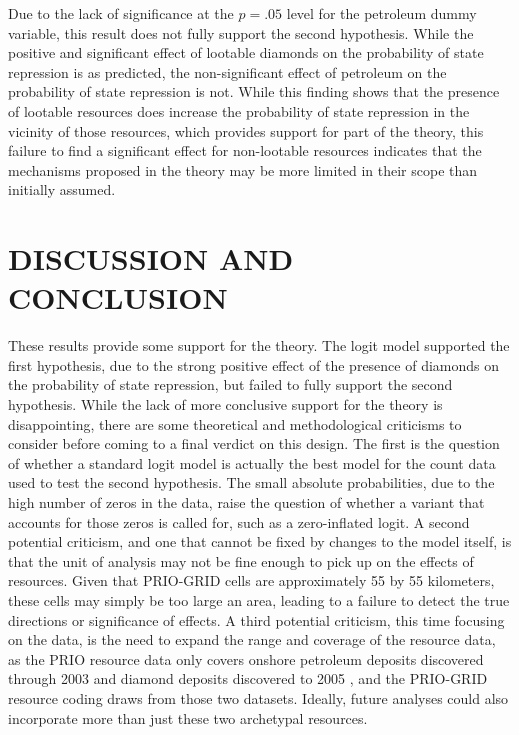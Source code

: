 Due to the lack of significance at the $p=.05$ level for the petroleum dummy variable, this result does not fully support the second hypothesis. While the positive and significant effect of lootable diamonds on the probability of state repression is as predicted, the non-significant effect of petroleum on the probability of state repression is not. While this finding shows that the presence of lootable resources does increase the probability of state repression in the vicinity of those resources, which provides support for part of the theory, this failure to find a significant effect for non-lootable resources indicates that the mechanisms proposed in the theory may be more limited in their scope than initially assumed. 

\newpage
\vspace*{25pt}
\section*{\normalfont \hfill DISCUSSION AND CONCLUSION \hfill}
These results provide some support for the theory. The logit model supported the first hypothesis, due to the strong positive effect of the presence of diamonds on the probability of state repression, but failed to fully support the second hypothesis. While the lack of more conclusive support for the theory is disappointing, there are some theoretical and methodological criticisms to consider before coming to a final verdict on this design. The first is the question of whether a standard logit model is actually the best model for the count data used to test the second hypothesis. The small absolute probabilities, due to the high number of zeros in the data, raise the question of whether a variant that accounts for those zeros is called for, such as a zero-inflated logit. A second potential criticism, and one that cannot be fixed by changes to the model itself, is that the unit of analysis may not be fine enough to pick up on the effects of resources. Given that PRIO-GRID cells are approximately 55 by 55 kilometers, these cells may simply be too large an area, leading to a failure to detect the true directions or significance of effects. A third potential criticism, this time focusing on the data, is the need to expand the range and coverage of the resource data, as the PRIO resource data only covers onshore petroleum deposits discovered through 2003 \cite{TRL7} and diamond deposits discovered to 2005 \cite{Gilmorecode}, and the PRIO-GRID resource coding draws from those two datasets. Ideally, future analyses could also incorporate more than just these two archetypal resources. 

